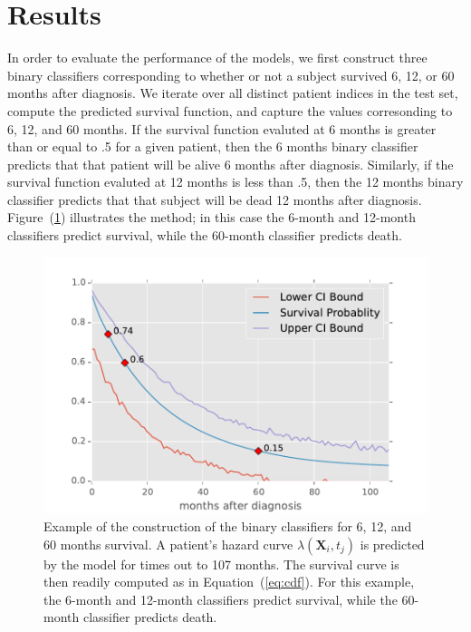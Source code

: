 \documentclass[10pt,letterpaper]{article}
\begin{document}
\section*{Results}
\label{sec:results}


In order to evaluate the performance of the models, we first construct three binary classifiers corresponding to whether or not a subject survived 6, 12, or 60 months after diagnosis. 
We iterate over all distinct patient indices in the test set, compute the predicted survival function, and capture the values corresonding to 6, 12, and 60 months.  
If the survival function evaluted at 6 months is greater than or equal to .5 for a given patient, then the 6 months binary classifier predicts that that patient will be alive 6 months after diagnosis. Similarly, if the survival function evaluted at 12 months is less than .5, then the 12 months binary classifier predicts that that subject will be dead 12 months after diagnosis. Figure~(\ref{fig:survivalexample}) illustrates the method; in this case the 6-month and 12-month classifiers predict survival, while the 60-month classifier predicts death.


\begin{figure}[h]
\centering 
\begin{center}
\includegraphics[width=.90\textwidth,origin=c]{survivalexamplewitherrors.pdf}
\caption{\label{fig:survivalexample} Example of the construction of the binary classifiers for 6, 12, and 60 months survival.
A patient's hazard curve $\lambda(\mathbf{X}_{i}, t_{j})$ is predicted by the model for times out to 107 months. The survival curve is then readily computed as in Equation~(\ref{eq:cdf}). For this example, the 6-month and 12-month classifiers predict survival, while the 60-month classifier predicts death.}
\end{center}
\end{figure}
\end{document}
